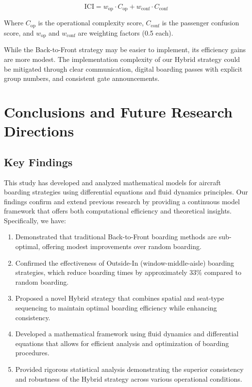 \documentclass[12pt]{article}
\begin{document}
\begin{equation}
\text{ICI} = w_{\text{op}} \cdot C_{\text{op}} + w_{\text{conf}} \cdot C_{\text{conf}}
\end{equation}

Where $C_{\text{op}}$ is the operational complexity score, $C_{\text{conf}}$ is the passenger confusion score, and $w_{\text{op}}$ and $w_{\text{conf}}$ are weighting factors (0.5 each).

While the Back-to-Front strategy may be easier to implement, its efficiency gains are more modest. The implementation complexity of our Hybrid strategy could be mitigated through clear communication, digital boarding passes with explicit group numbers, and consistent gate announcements.

\section{Conclusions and Future Research Directions}

\subsection{Key Findings}

This study has developed and analyzed mathematical models for aircraft boarding strategies using differential equations and fluid dynamics principles. Our findings confirm and extend previous research by providing a continuous model framework that offers both computational efficiency and theoretical insights. Specifically, we have:

\begin{enumerate}
    \item Demonstrated that traditional Back-to-Front boarding methods are sub-optimal, offering modest improvements over random boarding.
    
    \item Confirmed the effectiveness of Outside-In (window-middle-aisle) boarding strategies, which reduce boarding times by approximately 33\% compared to random boarding.
    
    \item Proposed a novel Hybrid strategy that combines spatial and seat-type sequencing to maintain optimal boarding efficiency while enhancing consistency.
    
    \item Developed a mathematical framework using fluid dynamics and differential equations that allows for efficient analysis and optimization of boarding procedures.
    
    \item Provided rigorous statistical analysis demonstrating the superior consistency and robustness of the Hybrid strategy across various operational conditions.
\end{enumerate}
\end{document}
